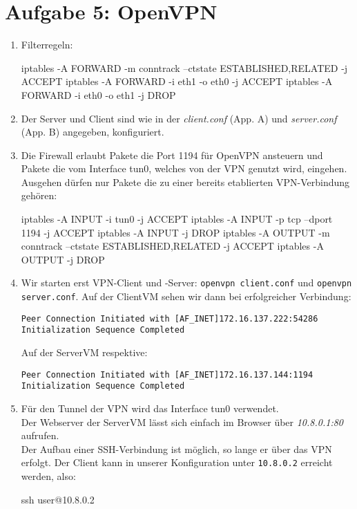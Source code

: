 \documentclass{scrartcl}
\begin{document}
	\section*{Aufgabe 5: OpenVPN}
	\label{sec:OpenVPN}
	\begin{enumerate}[\bfseries 1.]
		\item
            Filterregeln:
		    \begin{rootcommands}
iptables -A FORWARD -m conntrack --ctstate ESTABLISHED,RELATED -j ACCEPT
iptables -A FORWARD -i eth1 -o eth0 -j ACCEPT
iptables -A FORWARD -i eth0 -o eth1 -j DROP
		    \end{rootcommands}

		\item
		    Der Server und Client sind wie in der \textit{client.conf} (App. A)
		    und \textit{server.conf} (App. B) angegeben, konfiguriert.
		\item
            Die Firewall erlaubt Pakete die Port 1194 für OpenVPN
		    ansteuern und Pakete die vom Interface tun0, welches von der VPN
		    genutzt wird, eingehen.
		    Ausgehen dürfen nur Pakete die zu einer bereits etablierten
		    VPN-Verbindung gehören:
		    \begin{rootcommands}
iptables -A INPUT -i tun0 -j ACCEPT
iptables -A INPUT -p tcp --dport 1194 -j ACCEPT
iptables -A INPUT -j DROP
iptables -A OUTPUT -m conntrack --ctstate ESTABLISHED,RELATED -j ACCEPT
iptables -A OUTPUT -j DROP
            \end{rootcommands}
		\item
		      Wir starten erst VPN-Client und -Server:
		      \texttt{openvpn client.conf} und \texttt{openvpn server.conf}.
		      Auf der ClientVM sehen wir dann bei erfolgreicher Verbindung:\\
              \begin{verbatim}
Peer Connection Initiated with [AF_INET]172.16.137.222:54286
Initialization Sequence Completed
              \end{verbatim}
		      Auf der ServerVM respektive:\\
              \begin{verbatim}
Peer Connection Initiated with [AF_INET]172.16.137.144:1194
Initialization Sequence Completed
              \end{verbatim}
		\item
		      Für den Tunnel der VPN wird das Interface tun0 verwendet.\\
		      Der Webserver der ServerVM lässt sich einfach im Browser über
		      \textit{10.8.0.1:80} aufrufen.\\
		      Der Aufbau einer SSH-Verbindung ist möglich, so lange er über das
              VPN erfolgt. Der Client kann in unserer Konfiguration unter
              \texttt{10.8.0.2} erreicht werden, also:
              \begin{usercommands}
ssh user@10.8.0.2
              \end{usercommands}
	\end{enumerate}
\end{document}
